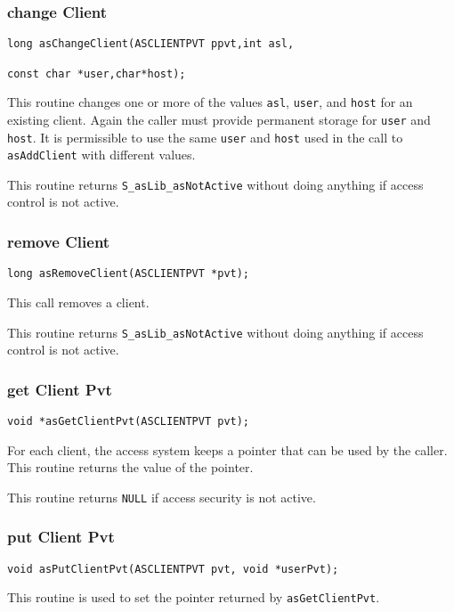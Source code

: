 \subsubsection{change Client}

\begin{verbatim}long asChangeClient(ASCLIENTPVT ppvt,int asl,

const char *user,char*host);
\end{verbatim}This routine changes one or more of the values \verb|asl|, \verb|user|, and \verb|host| for an existing client. Again the caller must provide 
permanent storage for \verb|user| and \verb|host|. It is permissible to use the same \verb|user| and \verb|host| used in the call to 
\verb|asAddClient| with different values.

This routine returns \verb|S_asLib_asNotActive| without doing anything if access control is not active.

\subsubsection{remove Client}

\begin{verbatim}long asRemoveClient(ASCLIENTPVT *pvt);
\end{verbatim}This call removes a client.

This routine returns \verb|S_asLib_asNotActive| without doing anything if access control is not active.

\subsubsection{get Client Pvt}

\begin{verbatim}void *asGetClientPvt(ASCLIENTPVT pvt); 
\end{verbatim}For each client, the access system keeps a pointer that can be used by the caller. This routine returns the value of the 
pointer.

This routine returns \verb|NULL| if access security is not active. 

\subsubsection{put Client Pvt}

\begin{verbatim}void asPutClientPvt(ASCLIENTPVT pvt, void *userPvt); 
\end{verbatim}This routine is used to set the pointer returned by \verb|asGetClientPvt|.

